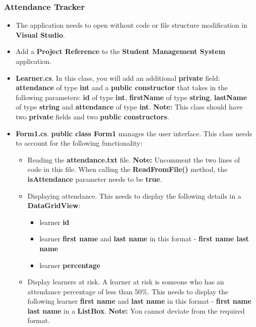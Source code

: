 \documentclass{article}
\begin{document}
\subsubsection*{Attendance Tracker}
\begin{itemize}
    \item The application needs to open without code or file structure modification in \textbf{Visual Studio}.
    \item Add a \textbf{Project Reference} to the \textbf{Student Management System} application.
    \item \textbf{Learner.cs}. In this class, you will add an additional \textbf{private} field: \textbf{attendance} of type \textbf{int} and a \textbf{public constructor} that takes in the following parameters: \textbf{id} of type \textbf{int}, \textbf{firstName} of type \textbf{string}, \textbf{lastName} of type \textbf{string} and \textbf{attendance} of type \textbf{int}. \textbf{Note:} This class should have two \textbf{private} fields and two \textbf{public constructors}.
    \item \textbf{Form1.cs}. \textbf{public class Form1} manages the user interface. This class needs to account for the following functionality:
    \begin{itemize}
        \item Reading the \textbf{attendance.txt} file. \textbf{Note:} Uncomment the two lines of code in this file. When calling the \textbf{ReadFromFile()} method, the \textbf{isAttendance} parameter needs to be \textbf{true}.  
        \item Displaying attendance. This needs to display the following details in a \textbf{DataGridView}:
        \begin{itemize}
            \item learner \textbf{id}
            \item learner \textbf{first name} and \textbf{last name} in this format - \textbf{first name last name}
            \item learner \textbf{percentage}
        \end{itemize}
        \item Display learners at risk. A learner at risk is someone who has an attendance percentage of less than 50\%. This needs to display the following learner \textbf{first name} and \textbf{last name} in this format - \textbf{first name last name} in a \textbf{ListBox}. \textbf{Note:} You cannot deviate from the required format.
    \end{itemize}
\end{itemize}
\end{document}
